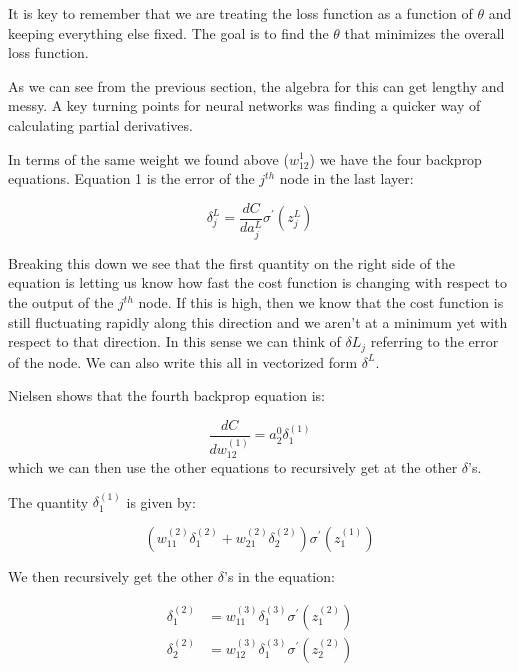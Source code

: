 It is key to remember that we are treating the loss function as a function of $\theta$ and keeping everything else fixed. The goal is to find the $\theta$ that minimizes the overall loss function.


As we can see from the previous section, the algebra for this can get lengthy and messy. A key turning points for neural networks was finding a quicker way of calculating partial derivatives. 

In terms of the same weight we found above ($w^{1}_{12}$) we have the four backprop equations. Equation 1 is the error of the $j^{th}$ node in the last layer:

\begin{equation}
\delta^{L}_j = \frac{dC}{da^L_j} \sigma^\prime(z_j^L)
\end{equation}

\noindent Breaking this down we see that the first quantity on the right side of the equation is letting us know how fast the cost function is changing with respect to the output of the $j^{th}$ node. If this is high, then we know that the cost function is still fluctuating rapidly along this direction and we aren't at a minimum yet with respect to that direction. In this sense we can think of $\delta{L}_j$ referring to the error of the node. We can also write this all in vectorized form $\delta^{L}$.

Nielsen shows that the fourth backprop equation is:


\begin{equation}
\frac{dC}{dw^{(1)}_{12}} = a_{2}^{0}\delta_1^{(1)}
\end{equation}
which we can then use the other equations to recursively get at the other $\delta$'s.

The quantity $\delta_1^{(1)}$ is given by:

\begin{equation}
(w_{11}^{(2)}\delta^{(2)}_1 + w_{21}^{(2)}\delta^{(2)}_2)\sigma^{\prime}(z_1^{(1)})
\end{equation}
 
 We then recursively get the other $\delta$'s in the equation:
 
 \begin{equation}
 \begin{split}
 \delta^{(2)}_1  & = w_{11}^{(3)}\delta_1^{(3)}\sigma^{\prime}(z_1^{(2)})\\
 \delta^{(2)}_2  & = w_{12}^{(3)}\delta_1^{(3)}\sigma^{\prime}(z_2^{(2)})
 \end{split}
 \end{equation}

